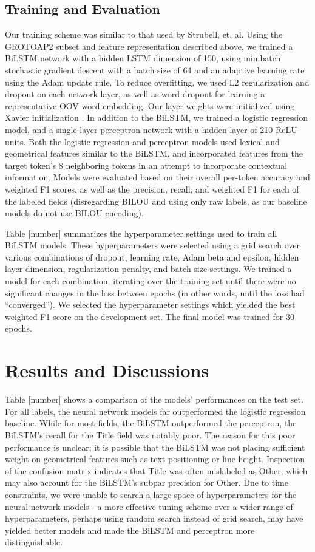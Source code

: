\documentclass{acm_proc_article-sp}
\begin{document}
\subsection{Training and Evaluation}
Our training scheme was similar to that used by Strubell, et. al. \cite{strubell2017fast} Using the GROTOAP2 subset and feature representation described above, we trained a BiLSTM network with a hidden LSTM dimension of 150, using minibatch stochastic gradient descent with a batch size of 64 and an adaptive learning rate using the Adam update rule. \cite{kingma2014adam} To reduce overfitting, we used L2 regularization and dropout on each network layer, as well as word dropout for learning a representative OOV word embedding. \cite{lample2016neural} Our layer weights were initialized using Xavier initialization \cite{glorot2010understanding}. In addition to the BiLSTM, we trained a logistic regression model, and a single-layer perceptron network with a hidden layer of 210 ReLU units. Both the logistic regression and perceptron models used lexical and geometrical features similar to the BiLSTM, and incorporated features from the target token’s 8 neighboring tokens in an attempt to incorporate contextual information. Models were evaluated based on their overall per-token accuracy and weighted F1 scores, as well as the precision, recall, and weighted F1 for each of the labeled fields (disregarding BILOU and using only raw labels, as our baseline models do not use BILOU encoding). 

Table [number] summarizes the hyperparameter settings used to train all BiLSTM models. These hyperparameters were selected using a grid search over various combinations of dropout, learning rate, Adam beta and epsilon, hidden layer dimension, regularization penalty, and batch size settings. We trained a model for each combination, iterating over the training set until there were no significant changes in the loss between epochs (in other words, until the loss had “converged”). We selected the hyperparameter settings which yielded the best weighted F1 score on the development set. The final model was trained for 30 epochs.


\section{Results and Discussions}
Table [number] shows a comparison of the models’ performances on the test set. For all labels, the neural network models far outperformed the logistic regression baseline. While for most fields, the BiLSTM outperformed the perceptron, the BiLSTM’s recall for the Title field was notably poor. The reason for this poor performance is unclear; it is possible that the BiLSTM was not placing sufficient weight on geometrical features such as text positioning or line height. Inspection of the confusion matrix indicates that Title was often mislabeled as Other, which may also account for the BiLSTM’s subpar precision for Other. Due to time constraints, we were unable to search a large space of hyperparameters for the neural network models - a more effective tuning scheme over a wider range of hyperparameters, perhaps using random search instead of grid search, may have yielded better models and made the BiLSTM and perceptron more distinguishable.
\end{document}

